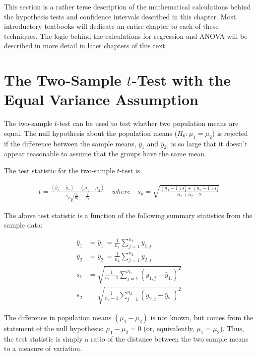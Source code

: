 \documentclass[
]{report}
\begin{document}
This section is a rather terse description of the mathematical calculations behind the hypothesis tests and confidence intervals described in this chapter. Most introductory textbooks will dedicate an entire chapter to each of these techniques. The logic behind the calculations for regression and ANOVA will be described in more detail in later chapters of this text.

\section*{\texorpdfstring{The Two-Sample \(t\)-Test with the Equal Variance Assumption}{The Two-Sample t-Test with the Equal Variance Assumption}}\label{the-two-sample-t-test-with-the-equal-variance-assumption}

The two-sample \(t\)-test can be used to test whether two population means are equal. The null hypothesis about the population means (\(H_0: \mu_1 = \mu_2\)) is rejected if the difference between the sample means, \(\bar{y}_1\) and \(\bar{y}_2\), is so large that it doesn't appear reasonable to assume that the groups have the same mean.

The test statistic for the two-sample \(t\)-test is

\begin{align} \label{2.7}
t = \frac{(\bar{y}_1 - \bar{y}_2) - (\mu_1 - \mu_2)}{s_p\sqrt{\frac{1}{n_1} + \frac{1}{n_2}}} 
\quad where \quad
s_p = \sqrt{\frac{(n_1-1)s_1^2 + (n_2-1)s_2^2}{n_1 + n_2 - 2}}
\tag{2.7}
\end{align}

The above test statistic is a function of the following summary statistics from the sample data:

\begin{align}
\bar{y}_1 &= \bar{y}_{1.} = \frac{1}{n_1}\sum_{j=1}^{n_1}y_{1,j} \\
\bar{y}_2 &= \bar{y}_{2.} = \frac{1}{n_2}\sum_{j=1}^{n_2}y_{2,j} \\
s_1 &= \sqrt{\frac{1}{n_1 - 1}\sum_{j=1}^{n_1}(y_{1,j} - \bar{y}_{1.})^2} \\
s_2 &= \sqrt{\frac{1}{n_2 - 1}\sum_{j=1}^{n_2}(y_{2,j} - \bar{y}_{2.})^2}
\end{align}

The difference in population means \((\mu_1 - \mu_2)\) is not known, but comes from the statement of the null hypothesis: \(\mu_1 - \mu_2 = 0\) (or, equivalently, \(\mu_1 = \mu_2\)). Thus, the test statistic is simply a ratio of the distance between the two sample means to a measure of variation.
\end{document}

